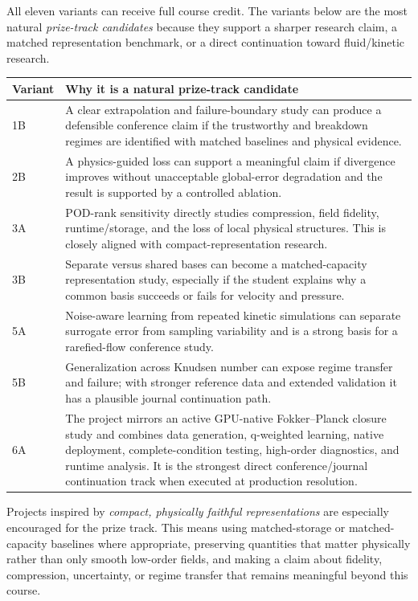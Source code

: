 \documentclass[11pt]{article}
\begin{document}
All eleven variants can receive full course credit. The variants below are the most natural \emph{prize-track candidates} because they support a sharper research claim, a matched representation benchmark, or a direct continuation toward fluid/kinetic research.

\begin{tabularx}{\textwidth}{@{}p{}Y@{}}
\toprule
\textbf{Variant} & \textbf{Why it is a natural prize-track candidate}\\
\midrule
1B & A clear extrapolation and failure-boundary study can produce a defensible conference claim if the trustworthy and breakdown regimes are identified with matched baselines and physical evidence.\\
2B & A physics-guided loss can support a meaningful claim if divergence improves without unacceptable global-error degradation and the result is supported by a controlled ablation.\\
3A & POD-rank sensitivity directly studies compression, field fidelity, runtime/storage, and the loss of local physical structures. This is closely aligned with compact-representation research.\\
3B & Separate versus shared bases can become a matched-capacity representation study, especially if the student explains why a common basis succeeds or fails for velocity and pressure.\\
5A & Noise-aware learning from repeated kinetic simulations can separate surrogate error from sampling variability and is a strong basis for a rarefied-flow conference study.\\
5B & Generalization across Knudsen number can expose regime transfer and failure; with stronger reference data and extended validation it has a plausible journal continuation path.\\
6A & The project mirrors an active GPU-native Fokker--Planck closure study and combines data generation, q-weighted learning, native deployment, complete-condition testing, high-order diagnostics, and runtime analysis. It is the strongest direct conference/journal continuation track when executed at production resolution.\\
\bottomrule
\end{tabularx}

Projects inspired by \emph{compact, physically faithful representations} are especially encouraged for the prize track. This means using matched-storage or matched-capacity baselines where appropriate, preserving quantities that matter physically rather than only smooth low-order fields, and making a claim about fidelity, compression, uncertainty, or regime transfer that remains meaningful beyond this course.
\end{document}
